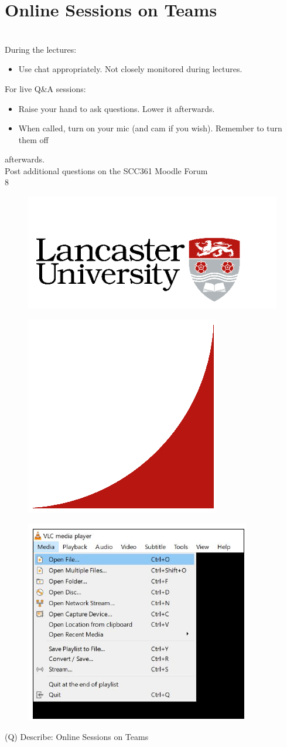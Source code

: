 \documentclass[12pt]{article}
\begin{document}
\section{Online Sessions on Teams}
\\
During the lectures:\\
\begin{itemize}
  \item Use  chat  appropriately. Not closely monitored during lectures.
\end{itemize}
For live Q\&A sessions:\\
\begin{itemize}
  \item Raise your hand to ask questions. Lower it afterwards.
  \item When called, turn on your mic (and cam if you wish). Remember to turn them off 
\end{itemize}
afterwards.\\
Post additional questions on the SCC361 Moodle Forum\\
8\\
\begin{figure}[H]
\includegraphics[width=0.5\linewidth]{page1-image-1.png}
\end{figure}
\begin{figure}[H]
\includegraphics[width=0.5\linewidth]{page1-image-2.png}
\end{figure}
\begin{figure}[H]
\includegraphics[width=0.5\linewidth]{page1-image-3.png}
\end{figure}
\clearpage
(Q)
Describe: Online Sessions on Teams
\clearpage
\end{document}
